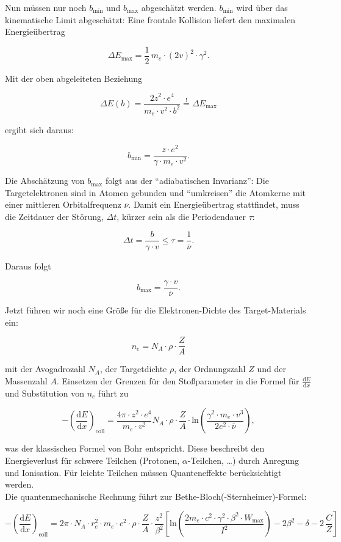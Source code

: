 Nun müssen nur noch $b_{\text{min}}$ und $b_{\text{max}}$ abgeschätzt werden. $b_{\text{min}}$ wird
über das kinematische Limit abgeschätzt: Eine frontale Kollision liefert den maximalen Energieübertrag

\[\Delta E_{\text{max}}=\frac{1}{2}\,m_e\cdot(2v)^2\cdot\gamma^2.\]

Mit der oben abgeleiteten Beziehung

\[\Delta E(b)=\frac{2z^2\cdot e^4}{m_e\cdot v^2 \cdot b^2}\overset{!}{=}\Delta E_{\text{max}}\]

ergibt sich daraus:

\[b_{\text{min}}=\frac{z\cdot e^2}{\gamma\cdot m_e\cdot v^2}.\]

Die Abschätzung von $b_{\text{max}}$ folgt aus der "`adiabatischen Invarianz"': Die Targetelektronen
sind in Atomen gebunden und "`umkreisen"' die Atomkerne mit einer mittleren Orbitalfrequenz
$\overline{\nu}$. Damit ein Energieübertrag stattfindet, muss die Zeitdauer der Störung, $\Delta t$,
kürzer sein als die Periodendauer $\tau$:

\[\Delta t=\frac{b}{\gamma\cdot v} \le \tau =\frac{1}{\overline{\nu}}.\]

Daraus folgt

\[b_{\text{max}}=\frac{\gamma\cdot v}{\overline{\nu}}.\]

Jetzt führen wir noch eine Größe für die Elektronen-Dichte des Target-Materials ein:

\[n_e=N_A\cdot \rho\cdot \frac{Z}{A}\]

mit der Avogadrozahl $N_A$, der Targetdichte $\rho$, der Ordnungszahl $Z$ und der Massenzahl $A$.
Einsetzen der Grenzen für den Stoßparameter in die Formel für $\frac{\mathrm{d}E}{\mathrm{d}x}$ und
Substitution von $n_e$ führt zu

\[-\left(\frac{\mathrm{d}E}{\mathrm{d}x}\right)_{\text{coll}} = \frac{4\pi\cdot z^2\cdot e^4}{m_e\cdot v^2}N_A\cdot
\rho\cdot \frac{Z}{A}\cdot\text{ln}\left(\frac{\gamma^2\cdot m_e\cdot
v^3}{2e^2\cdot\overline{\nu}}\right), \]

was der klassischen Formel von Bohr entspricht. Diese beschreibt den Energieverlust für schwere
Teilchen (Protonen, $\alpha$-Teilchen, \ldots) durch Anregung und Ionisation. Für leichte Teilchen
müssen Quanteneffekte berücksichtigt werden.
\\
Die quantenmechanische Rechnung führt zur Bethe-Bloch(-Sternheimer)-Formel:

\[-\left(\frac{\mathrm{d}E}{\mathrm{d}x}\right)_{\text{coll}} = 2\pi\cdot N_A\cdot r_e^2\cdot
m_e\cdot c^2 \cdot \rho\cdot \frac{Z}{A}\cdot \frac{z^2}{\beta^2}\left[ \text{ln} \left(
\frac{2m_e\cdot c^2 \cdot\gamma^2 \cdot\beta^2 \cdot W_{\text{max}}}{I^2} \right) -2\beta^2 -\delta
-2\,\frac{C}{Z} \right]\]

